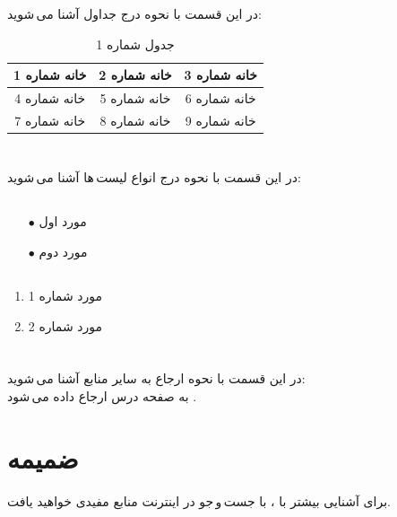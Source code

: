 \documentclass{article}
\begin{document}
\section{}
در این قسمت با نحوه درج جداول آشنا می\,شوید:
\begin{table}[ht]
    \centering
    \begin{tabular}{|c|c|c|}
    \hline
    خانه شماره 1 & خانه شماره 2 & خانه شماره 3\\
    \hline
    خانه شماره 4 & خانه شماره 5 & خانه شماره 6\\
    \hline
    خانه شماره 7 & خانه شماره 8 & خانه شماره 9\\
    \hline
    \end{tabular}
    \caption{جدول شماره 1}
    \label{tab:tab1}
\end{table}

\section{}
در این قسمت با نحوه درج انواع لیست\,ها آشنا می\,شوید:
\subsection{}
\begin{itemize}
    \item [$\bullet$] مورد اول
    \item [$\bullet$] مورد دوم
\end{itemize}
\subsection{}
\begin{enumerate}
    \item مورد شماره 1
    \item مورد شماره 2
\end{enumerate}

\section{}
در این قسمت با نحوه ارجاع به سایر منابع آشنا می\,شوید:\\
\indent
به صفحه درس ارجاع داده می\,شود \cite{b1}.

\section{ضمیمه}
برای آشنایی بیشتر با \lr{\LaTeX}، با جست\,و\,جو در اینترنت منابع مفیدی خواهید یافت.
\end{document}
